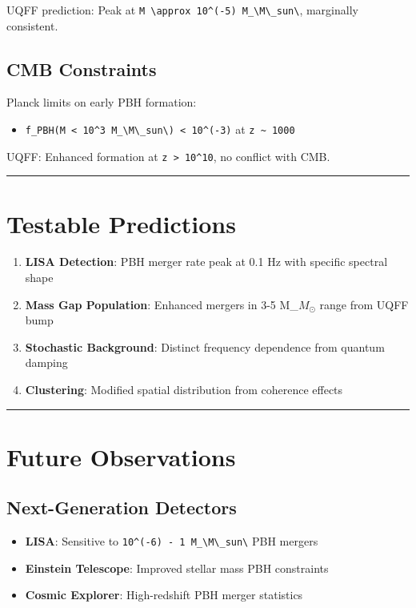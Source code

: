 \documentclass[12pt,a4paper]{article}
\begin{document}
UQFF prediction: Peak at \texttt{M \textbackslash approx 10\^{}(-5) M\_\textbackslash {M\textbackslash \_sun\textbackslash }}, marginally consistent.

\subsection{CMB Constraints}

Planck limits on early PBH formation:

\begin{itemize}
  \item \texttt{f\_PBH(M < 10\^{}3 M\_\textbackslash {M\textbackslash \_sun\textbackslash }) < 10\^{}(-3)} at \texttt{z \textasciitilde{} 1000}
\end{itemize}

UQFF: Enhanced formation at \texttt{z > 10\^{}10}, no conflict with CMB.

\medskip\hrule\medskip

\section{Testable Predictions}

\begin{enumerate}
  \item \textbf{LISA Detection}: PBH merger rate peak at 0.1 Hz with specific spectral shape
  \item \textbf{Mass Gap Population}: Enhanced mergers in 3-5 M\_{$M_{\odot}$} range from UQFF bump
  \item \textbf{Stochastic Background}: Distinct frequency dependence from quantum damping
  \item \textbf{Clustering}: Modified spatial distribution from coherence effects
\end{enumerate}

\medskip\hrule\medskip

\section{Future Observations}

\subsection{Next-Generation Detectors}

\begin{itemize}
  \item \textbf{LISA}: Sensitive to \texttt{10\^{}(-6) - 1 M\_\textbackslash {M\textbackslash \_sun\textbackslash }} PBH mergers
  \item \textbf{Einstein Telescope}: Improved stellar mass PBH constraints
  \item \textbf{Cosmic Explorer}: High-redshift PBH merger statistics
\end{itemize}
\end{document}
